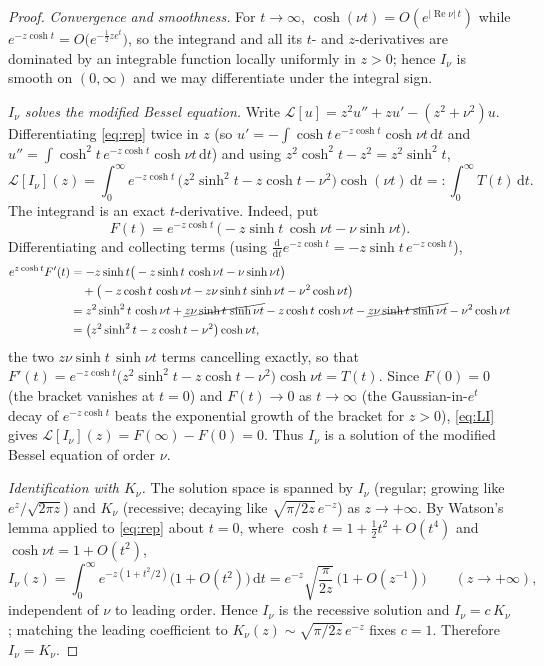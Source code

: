 \documentclass[11pt]{article}
\theoremstyle{definition}
\theoremstyle{remark}
\newcommand{\dd}{\mathrm{d}}
\DeclareMathOperator{\Real}{Re}
\begin{document}
\begin{proof}
\emph{Convergence and smoothness.} For $t\to\infty$, $\cosh(\nu t)=O(e^{|\Real\nu|\,t})$ while
$e^{-z\cosh t}=O\!\big(e^{-\tfrac12 z e^{t}}\big)$, so the integrand and all its $t$- and $z$-derivatives are
dominated by an integrable function locally uniformly in $z>0$; hence $I_\nu$ is smooth on $(0,\infty)$ and we may
differentiate under the integral sign.

\emph{$I_\nu$ solves the modified Bessel equation.} Write $\mathcal L[u]=z^2u''+zu'-(z^2+\nu^2)u$. Differentiating
\eqref{eq:rep} twice in $z$ (so $u'=-\int\cosh t\,e^{-z\cosh t}\cosh\nu t\,\dd t$ and
$u''=\int\cosh^2 t\,e^{-z\cosh t}\cosh\nu t\,\dd t$) and using $z^2\cosh^2t-z^2=z^2\sinh^2t$,
\begin{equation}
  \mathcal L[I_\nu](z)=\int_0^\infty e^{-z\cosh t}\,\big(z^2\sinh^2 t-z\cosh t-\nu^2\big)\cosh(\nu t)\,\dd t
  =:\int_0^\infty T(t)\,\dd t .
  \label{eq:LI}
\end{equation}
The integrand is an exact $t$-derivative. Indeed, put
\begin{equation}
  F(t)=e^{-z\cosh t}\,\big(-z\sinh t\,\cosh\nu t-\nu\sinh\nu t\big).
\end{equation}
Differentiating and collecting terms (using $\tfrac{\dd}{\dd t}e^{-z\cosh t}=-z\sinh t\,e^{-z\cosh t}$),
\begin{align*}
  e^{z\cosh t}F'(t)
   &=-z\sinh t\big(-z\sinh t\,\cosh\nu t-\nu\sinh\nu t\big)\\
   &\quad{}+\big(-z\cosh t\,\cosh\nu t-z\nu\sinh t\,\sinh\nu t-\nu^2\cosh\nu t\big)\\
   &=z^2\sinh^2 t\,\cosh\nu t+\cancel{z\nu\sinh t\,\sinh\nu t}
     -z\cosh t\,\cosh\nu t-\cancel{z\nu\sinh t\,\sinh\nu t}-\nu^2\cosh\nu t\\
   &=\big(z^2\sinh^2 t-z\cosh t-\nu^2\big)\cosh\nu t,
\end{align*}
the two $z\nu\sinh t\,\sinh\nu t$ terms cancelling exactly, so that
$F'(t)=e^{-z\cosh t}\big(z^2\sinh^2 t-z\cosh t-\nu^2\big)\cosh\nu t=T(t)$. Since $F(0)=0$ (the bracket vanishes at $t=0$) and
$F(t)\to0$ as $t\to\infty$ (the Gaussian-in-$e^t$ decay of $e^{-z\cosh t}$ beats the exponential growth of the
bracket for $z>0$), \eqref{eq:LI} gives $\mathcal L[I_\nu](z)=F(\infty)-F(0)=0$. Thus $I_\nu$ is a solution of the
modified Bessel equation of order $\nu$.

\emph{Identification with $K_\nu$.} The solution space is spanned by $I_\nu$ (regular; growing like
$e^{z}/\sqrt{2\pi z}$) and $K_\nu$ (recessive; decaying like $\sqrt{\pi/2z}\,e^{-z}$) as $z\to+\infty$. By Watson's
lemma applied to \eqref{eq:rep} about $t=0$, where $\cosh t=1+\tfrac12 t^2+O(t^4)$ and $\cosh\nu t=1+O(t^2)$,
\begin{equation}
  I_\nu(z)=\int_0^\infty e^{-z(1+t^2/2)}\big(1+O(t^2)\big)\,\dd t
          =e^{-z}\sqrt{\frac{\pi}{2z}}\,\big(1+O(z^{-1})\big)\qquad(z\to+\infty),
\end{equation}
independent of $\nu$ to leading order. Hence $I_\nu$ is the recessive solution and $I_\nu=c\,K_\nu$; matching the
leading coefficient to $K_\nu(z)\sim\sqrt{\pi/2z}\,e^{-z}$ fixes $c=1$. Therefore $I_\nu=K_\nu$.
\end{proof}
\end{document}
